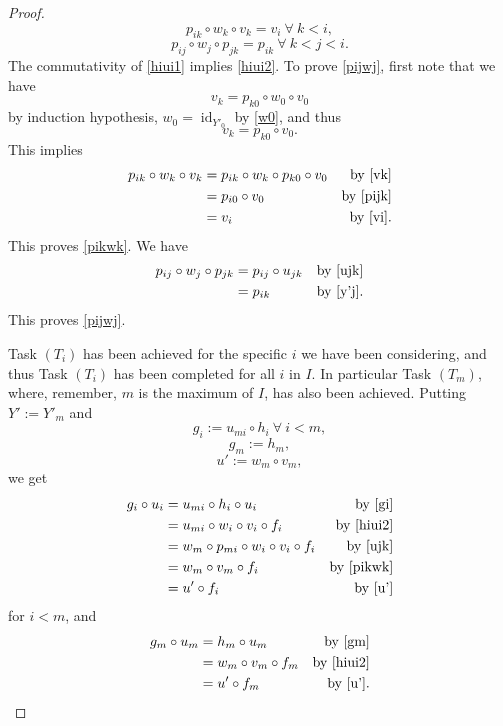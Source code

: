 \documentclass[12pt]{article}%
\theoremstyle{remark}
\theoremstyle{definition}
\DeclareMathOperator{\id}{id}
\begin{document}
\begin{proof}
\begin{equation}
\end{equation}
%
\begin{equation}\label{pikwk}
p_{ik}\circ w_k\circ v_k=v_i\ \forall\ k<i,
\end{equation}
%
\begin{equation}\label{pijwj}
p_{ij}\circ w_j\circ p_{jk}=p_{ik}\ \forall\ k<j<i.
\end{equation} 
%
The commutativity of \eqref{hiui1} implies \eqref{hiui2}. To prove \eqref{pijwj}, first note that we have 
$$v_k=p_{k0}\circ w_0\circ v_0
$$ 
by induction hypothesis, $w_0=\id_{Y'_0}$ by \eqref{w0}, and thus 
%
\begin{equation}\label{vk}
v_k=p_{k0}\circ v_0.
\end{equation}
%
This implies
% 
\begin{align*}
p_{ik}\circ w_k\circ v_k&=p_{ik}\circ w_k\circ p_{k0}\circ v_0&\text{by \eqref{vk}}\\ 
&=p_{i0}\circ v_0&\text{by \eqref{pijk}}\\ 
&=v_i&\text{by \eqref{vi}}.
\end{align*}
%
This proves \eqref{pikwk}. We have 
% 
\begin{align*}
p_{ij}\circ w_j\circ p_{jk}&=p_{ij}\circ u_{jk}&\text{by \eqref{ujk}}\\ 
&=p_{ik}&\text{by \eqref{y'j}}.
\end{align*}
%
This proves \eqref{pijwj}. 

Task $(T_i)$ has been achieved for the specific $i$ we have been considering, and thus Task $(T_i)$ has been completed for all $i$ in $I$. In particular Task $(T_m)$, where, remember, $m$ is the maximum of $I$, has also been achieved. Putting $Y':=Y'_m$ and 
%
\begin{equation}\label{gi}
g_i:=u_{mi}\circ h_i\ \forall\ i<m,
\end{equation}
%
\begin{equation}\label{gm}
g_m:=h_m,
\end{equation}
%
\begin{equation}\label{u'}
u':=w_m\circ v_m,
\end{equation}
%
we get
% 
\begin{align*}
g_i\circ u_i&=u_{mi}\circ h_i\circ u_i&\text{by \eqref{gi}}\\ 
&=u_{mi}\circ w_i\circ v_i\circ f_i&\text{by \eqref{hiui2}}\\ 
&=w_m\circ p_{mi}\circ w_i\circ v_i\circ f_i&\text{by \eqref{ujk}}\\ 
&=w_m\circ v_m\circ f_i&\text{by \eqref{pikwk}}\\ 
&=u'\circ f_i&\text{by \eqref{u'}}
\end{align*}
%
for $i<m$, and 
% 
\begin{align*}
g_m\circ u_m&=h_m\circ u_m&\text{by \eqref{gm}}\\ 
&=w_m\circ v_m\circ f_m&\text{by \eqref{hiui2}}\\ 
&=u'\circ f_m&\text{by \eqref{u'}}.
\end{align*}
%
\end{proof}
\end{document}
